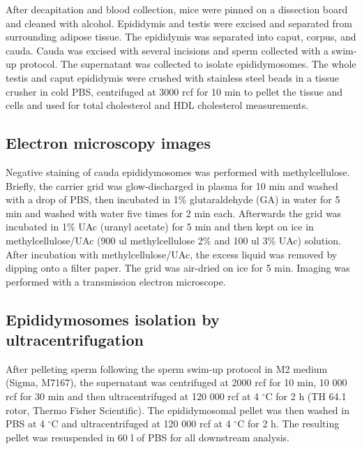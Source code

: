 \documentclass[12pt,twoside]{reedthesis}
\begin{document}
After decapitation and blood collection, mice were pinned on a
dissection board and cleaned with alcohol. Epididymis and testis were
excised and separated from surrounding adipose tissue. The epididymis
was separated into caput, corpus, and cauda. Cauda was excised with
several incisions and sperm collected with a swim-up protocol. The
supernatant was collected to isolate epididymosomes. The whole testis
and caput epididymis were crushed with stainless steel beads in a tissue
crusher in cold PBS, centrifuged at 3000 rcf for 10 min to pellet the
tissue and cells and used for total cholesterol and HDL cholesterol
measurements.

\hypertarget{electron-microscopy-images}{%
\subsection{Electron microscopy images}\label{electron-microscopy-images}}

Negative staining of cauda epididymosomes was performed with
methylcellulose. Briefly, the carrier grid was glow-discharged in plasma
for 10 min and washed with a drop of PBS, then incubated in 1\%
glutaraldehyde (GA) in water for 5 min and washed with water five times
for 2 min each. Afterwards the grid was incubated in 1\% UAc (uranyl
acetate) for 5 min and then kept on ice in methylcellulose/UAc (900 ul
methylcellulose 2\% and 100 ul 3\% UAc) solution. After incubation with
methylcellulose/UAc, the excess liquid was removed by dipping onto a
filter paper. The grid was air-dried on ice for 5 min. Imaging was
performed with a transmission electron microscope.

\hypertarget{epididymosomes-isolation-by-ultracentrifugation}{%
\subsection{Epididymosomes isolation by ultracentrifugation}\label{epididymosomes-isolation-by-ultracentrifugation}}

After pelleting sperm following the sperm swim-up protocol in M2 medium
(Sigma, M7167), the supernatant was centrifuged at 2000 rcf for 10 min,
10 000 rcf for 30 min and then ultracentrifuged at 120 000 rcf at 4
\(^{\circ}\)C for 2 h (TH 64.1 rotor, Thermo Fisher Scientific). The
epididymosomal pellet was then washed in PBS at 4 \(^{\circ}\)C and
ultracentrifuged at 120 000 rcf at 4 \(^{\circ}\)C for 2 h. The resulting
pellet was resuspended in 60 \textmu l of PBS for all downstream
analysis.
\end{document}
